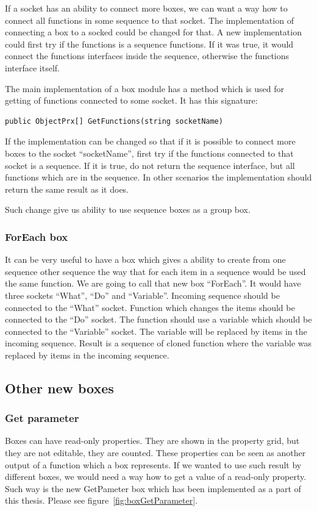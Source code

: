\documentclass[a4paper,12pt]{book}
\begin{document}
If a socket has an ability to connect more boxes, we can want a way how to connect all functions in some sequence to that socket. The implementation of connecting a box to a socked could be changed for that. A new implementation could first try if the functions is a sequence functions. If it was true, it would connect the functions interfaces inside the sequence, otherwise the functions interface itself.

The main implementation of a box module has a method which is used for getting of functions connected to some socket. It has this signature:
\begin{verbatim}
public ObjectPrx[] GetFunctions(string socketName)
\end{verbatim}

If the implementation can be changed so that if it is possible to connect more boxes to the socket ``socketName'', first try if the functions connected to that socket is a sequence. If it is true, do not return the sequence interface, but all functions which are in the sequence. In other scenarios the implementation should return the same result as it does.

Such change give us ability to use sequence boxes as a group box.

\subsubsection{ForEach box}
It can be very useful to have a box which gives a ability to create from one sequence other sequence the way that for each item in a sequence would be used the same function. We are going to call that new box ``ForEach''. It would have three sockets ``What'', ``Do'' and ``Variable''. Incoming sequence should be connected to the ``What'' socket. Function which changes the items should be connected to the ``Do'' socket. The function should use a variable which should be connected to the ``Variable'' socket. The variable will be replaced by items in the incoming sequence. Result is a sequence of cloned function where the variable was replaced by items in the incoming sequence. 

\subsection{Other new boxes}
\subsubsection{Get parameter}
Boxes can have read-only properties. They are shown in the property grid, but they are not editable, they are counted. These properties can be seen as another output of a function which a box represents. If we wanted to use such result by different boxes, we would need a way how to get a value of a read-only property. Such way is the new GetPameter box which has been implemented as a part of this thesis. Please see figure~\ref{fig:boxGetParameter}.
\end{document}
